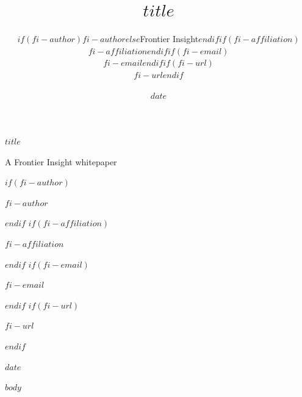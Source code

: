 \documentclass[11pt,a4paper]{article}
\title{\Huge\bfseries $title$}
\author{$if(fi-author)$$fi-author$$else$Frontier Insight$endif$$if(fi-affiliation)$\\{\small $fi-affiliation$}$endif$$if(fi-email)$\\{\small $fi-email$}$endif$$if(fi-url)$\\{\small $fi-url$}$endif$}
\date{$date$}
\begin{document}
\begin{titlepage}
  \vspace*{2cm}
  {\Huge\bfseries $title$ \par}
  \vspace{1cm}
  {\Large A Frontier Insight whitepaper \par}
$if(fi-author)$
  \vspace{0.8cm}
  {\large $fi-author$ \par}
$endif$
$if(fi-affiliation)$
  {\normalsize $fi-affiliation$ \par}
$endif$
$if(fi-email)$
  {\normalsize $fi-email$ \par}
$endif$
$if(fi-url)$
  {\normalsize $fi-url$ \par}
$endif$
  \vfill
  {\large $date$ \par}
\end{titlepage}

\tableofcontents
\clearpage

$body$
\end{document}
